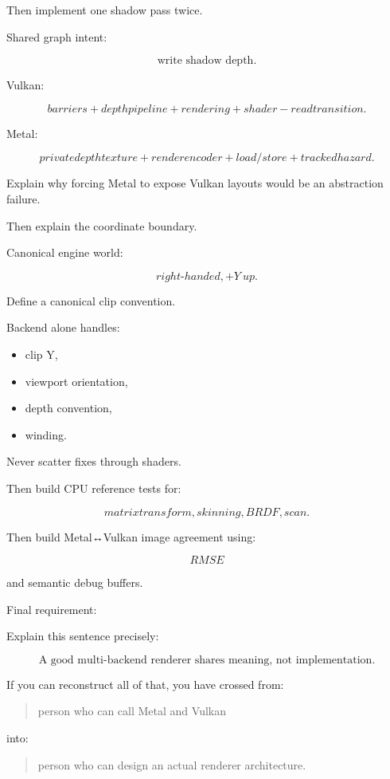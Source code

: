 Then implement one shadow pass twice.

Shared graph intent:

\[
\text{write shadow depth}.
\]

Vulkan:

\[
barriers+
depth pipeline+
rendering+
shader-read transition.
\]

Metal:

\[
private depth texture+
render encoder+
load/store+
tracked hazard.
\]

Explain why forcing Metal to expose Vulkan layouts would be an abstraction failure.

Then explain the coordinate boundary.

Canonical engine world:

\[
right\text{-}handed,
+Y\ up.
\]

Define a canonical clip convention.

Backend alone handles:

\begin{itemize}
\tightlist
\item
  clip Y,
\item
  viewport orientation,
\item
  depth convention,
\item
  winding.
\end{itemize}

Never scatter fixes through shaders.

Then build CPU reference tests for:

\[
matrix transform,
skinning,
BRDF,
scan.
\]

Then build Metal↔Vulkan image agreement using:

\[
RMSE
\]

and semantic debug buffers.

Final requirement:

Explain this sentence precisely:

\[
\boxed{
\text{A good multi-backend renderer shares meaning, not implementation.}
}
\]

If you can reconstruct all of that, you have crossed from:

\begin{quote}
person who can call Metal and Vulkan
\end{quote}

into:

\begin{quote}
person who can design an actual renderer architecture.
\end{quote}

